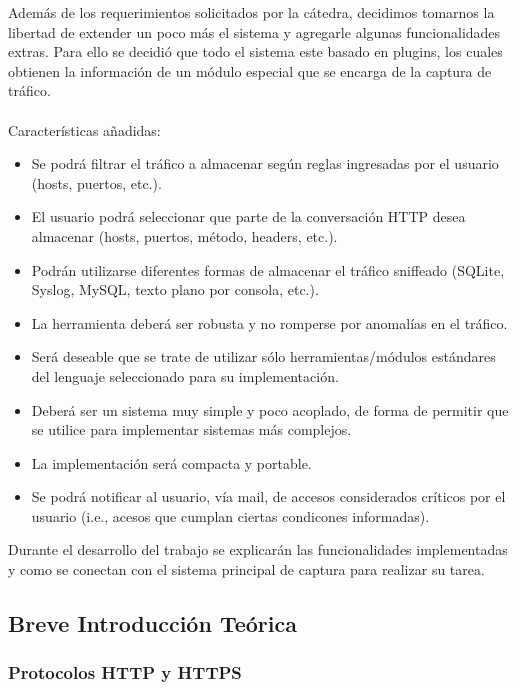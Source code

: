 Además de los requerimientos solicitados por la cátedra, decidimos tomarnos la li\-bertad de extender un poco más el sistema y agregarle algunas funcionalidades extras. Para ello se decidió que todo el sistema este basado en plugins, los cuales obtienen la información de un módulo especial que se encarga de la captura de tráfico.
\\\\
Características añadidas:
\begin{itemize}
	\item Se podrá filtrar el tráfico a almacenar según reglas ingresadas por el usuario (hosts, puertos, etc.).
	\item El usuario podrá seleccionar que parte de la conversación HTTP desea almacenar (hosts, puertos, método, headers, etc.).
	\item Podrán utilizarse diferentes formas de almacenar el tráfico sniffeado (SQLite, Syslog, MySQL, texto plano por consola, etc.).
	\item La herramienta deberá ser robusta y no romperse por anomalías en el tráfico.
	\item Será deseable que se trate de utilizar sólo herramientas/módulos estándares del lenguaje seleccionado para su implementación.
	\item Deberá ser un sistema muy simple y poco acoplado, de forma de permitir que se utilice para implementar sistemas más complejos.
	\item La implementación será compacta y portable.
	\item Se podrá notificar al usuario, vía mail, de accesos considerados críticos por el usuario (i.e., acesos que cumplan ciertas condicones informadas).
\end{itemize}

Durante el desarrollo del trabajo se explicarán las funcionalidades implementadas y como se conectan con el sistema principal de captura para realizar su tarea.

\subsection{Breve Introducción Teórica}

\subsubsection{Protocolos HTTP y HTTPS}

